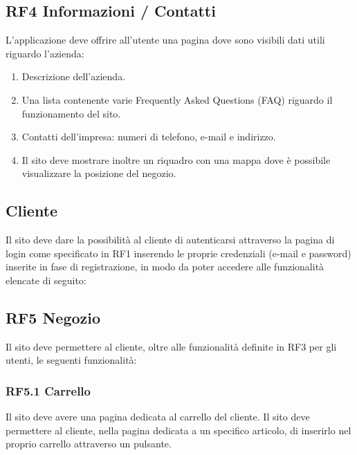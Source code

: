 \documentclass{report}
\begin{document}
\subsection*{RF4 Informazioni / Contatti}
L’applicazione deve offrire all’utente una pagina dove sono visibili dati utili riguardo l'azienda:

\begin{enumerate}
	\item Descrizione dell'azienda.
	\item Una lista contenente varie Frequently Asked Questions (FAQ) riguardo il funzionamento del sito.
	\item Contatti dell’impresa: numeri di telefono, e-mail e indirizzo.
	\item Il sito deve mostrare inoltre un riquadro con una mappa dove è possibile visualizzare la posizione del negozio.
\end{enumerate}


\subsection{Cliente}
Il sito deve dare la possibilità al cliente di autenticarsi attraverso la pagina di login come specificato in RF1 inserendo le proprie credenziali (e-mail e password) inserite in fase di registrazione, in modo da poter accedere alle funzionalità elencate di seguito:

\subsection*{RF5 Negozio}
Il sito deve permettere al cliente, oltre alle funzionalità definite in RF3 per gli utenti, le seguenti funzionalità:

\subsubsection{RF5.1 Carrello}
Il sito deve avere una pagina dedicata al carrello del cliente.
Il sito deve permettere al cliente, nella pagina dedicata a un specifico articolo, di inserirlo nel proprio carrello attraverso un pulsante.
\end{document}
